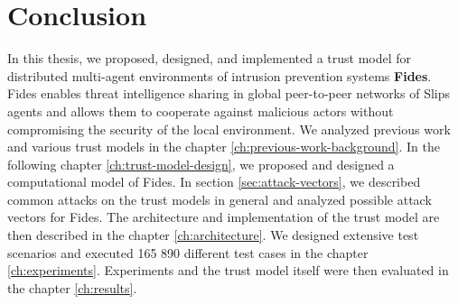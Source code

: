 \chapter{Conclusion}
\label{ch:conclusion}
In this thesis, we proposed, designed, and implemented a trust model for distributed multi-agent environments of intrusion prevention systems \textbf{Fides}.
Fides enables threat intelligence sharing in global peer-to-peer networks of Slips agents and allows them to cooperate against malicious actors without compromising the security of the local environment. 
We analyzed previous work and various trust models in the chapter \ref{ch:previous-work-background}.
In the following chapter \ref{ch:trust-model-design}, we proposed and designed a computational model of Fides.
In section \ref{sec:attack-vectors}, we described common attacks on the trust models in general and analyzed possible attack vectors for Fides.
The architecture and implementation of the trust model are then described in the chapter \ref{ch:architecture}.
We designed extensive test scenarios and executed 165 890 different test cases in the chapter \ref{ch:experiments}.
Experiments and the trust model itself were then evaluated in the chapter \ref{ch:results}.



